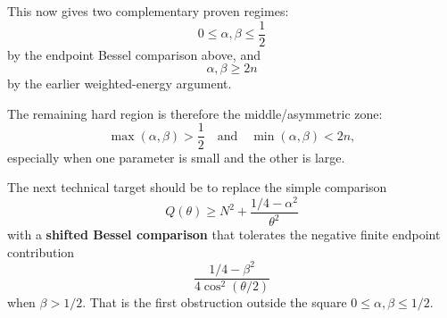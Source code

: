 \documentclass[11pt]{article}
\begin{document}
This now gives two complementary proven regimes:
\begin{equation*}
\boxed{
0\le\alpha,\beta\le\frac12
}
\end{equation*}
by the endpoint Bessel comparison above, and
\begin{equation*}
\boxed{
\alpha,\beta\ge2n
}
\end{equation*}
by the earlier weighted-energy argument.

The remaining hard region is therefore the middle/asymmetric zone:
\begin{equation*}
\max(\alpha,\beta)>\frac12
\quad\text{and}\quad
\min(\alpha,\beta)<2n,
\end{equation*}
especially when one parameter is small and the other is large.

The next technical target should be to replace the simple comparison
\begin{equation*}
Q(\theta)\ge N^2+\frac{1/4-\alpha^2}{\theta^2}
\end{equation*}
with a \textbf{shifted Bessel comparison} that tolerates the negative finite endpoint contribution
\begin{equation*}
\frac{1/4-\beta^2}{4\cos^2(\theta/2)}
\end{equation*}
when \(\beta>1/2\). That is the first obstruction outside the square \(0\le\alpha,\beta\le1/2\).
\end{document}
